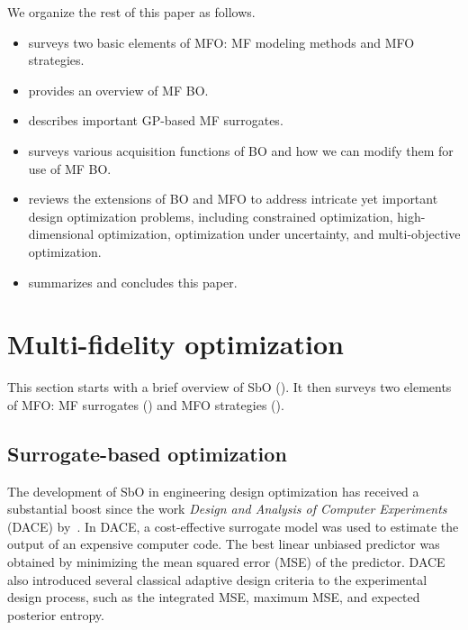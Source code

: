 \documentclass[iicol,sn-basic]{sn-jnl}%
\begin{document}
We organize the rest of this paper as follows.
\begin{itemize}
	\item {} surveys two basic elements of MFO: MF modeling methods and MFO strategies.

	\item {} provides an overview of MF BO.
	
	\item {} describes important GP-based MF surrogates.
	
	\item {} surveys various acquisition functions of BO and how we can modify them for use of MF BO.
	
	\item {} reviews the extensions of BO and MFO to address intricate yet important design optimization problems, including constrained optimization, high-dimensional optimization, optimization under uncertainty, and multi-objective optimization.
	
	\item {} summarizes and concludes this paper.
\end{itemize} 

\section{Multi-fidelity optimization}\label{Sec2}

This section starts with a brief overview of SbO ().
It then surveys two elements of MFO: MF surrogates () and MFO strategies ().

\subsection{Surrogate-based optimization}\label{Sec21}

The development of SbO in engineering design optimization has received a substantial boost since the work \textit{Design and Analysis of Computer Experiments} (DACE) by~\cite{Sacks1989}.
In DACE, a cost-effective surrogate model was used to estimate the output of an expensive computer code.
The best linear unbiased predictor was obtained by minimizing the mean squared error (MSE) of the predictor.
DACE also introduced several classical adaptive design criteria to the experimental design process, such as the integrated MSE, maximum MSE, and expected posterior entropy.
\end{document}
